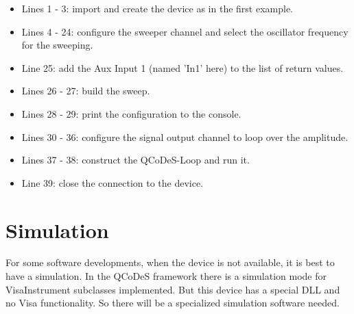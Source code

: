 \documentclass[11pt]{article} %
\begin{document}
\begin{itemize}[]
\itemsep0pt
\item Lines 1 - 3: import and create the device as in the first example.
\item Lines 4 - 24: configure the sweeper channel and select the oscillator frequency for the sweeping.
\item Line 25: add the Aux Input 1 (named 'In1' here) to the list of return values.
\item Lines 26 - 27: build the sweep.
\item Lines 28 - 29: print the configuration to the console.
\item Lines 30 - 36: configure the signal output channel to loop over the amplitude.
\item Lines 37 - 38: construct the QCoDeS-Loop and run it.
\item Line 39: close the connection to the device.
\end{itemize}

\clearpage

\section{Simulation}
For some software developments, when the device is not available, it is best to have a simulation. In the QCoDeS framework there is a simulation mode for VisaInstrument subclasses implemented. But this device has a special DLL and no Visa functionality. So there will be a specialized simulation software needed.
\end{document}
